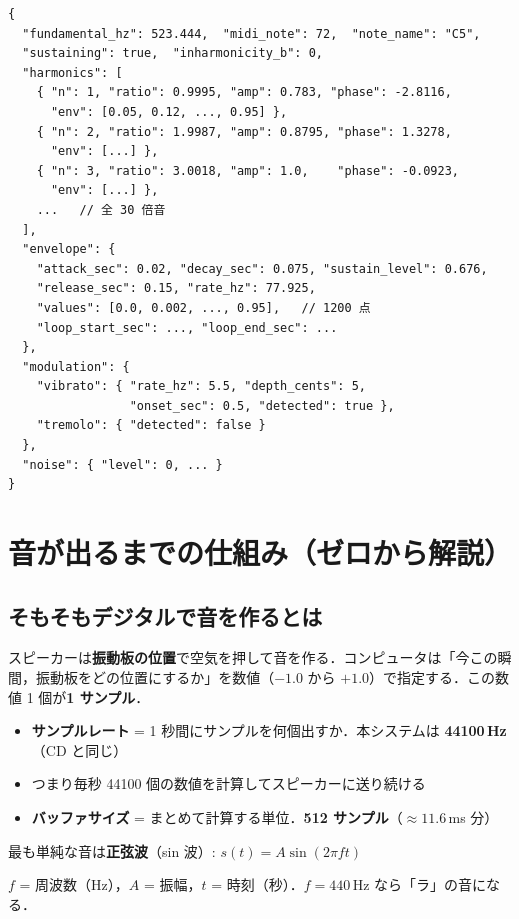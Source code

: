 \documentclass[uplatex,dvipdfmx,a4paper,10pt]{jsarticle}
\begin{document}
\begingroup\footnotesize
\begin{verbatim}
{
  "fundamental_hz": 523.444,  "midi_note": 72,  "note_name": "C5",
  "sustaining": true,  "inharmonicity_b": 0,
  "harmonics": [
    { "n": 1, "ratio": 0.9995, "amp": 0.783, "phase": -2.8116,
      "env": [0.05, 0.12, ..., 0.95] },
    { "n": 2, "ratio": 1.9987, "amp": 0.8795, "phase": 1.3278,
      "env": [...] },
    { "n": 3, "ratio": 3.0018, "amp": 1.0,    "phase": -0.0923,
      "env": [...] },
    ...   // 全 30 倍音
  ],
  "envelope": {
    "attack_sec": 0.02, "decay_sec": 0.075, "sustain_level": 0.676,
    "release_sec": 0.15, "rate_hz": 77.925,
    "values": [0.0, 0.002, ..., 0.95],   // 1200 点
    "loop_start_sec": ..., "loop_end_sec": ...
  },
  "modulation": {
    "vibrato": { "rate_hz": 5.5, "depth_cents": 5,
                 "onset_sec": 0.5, "detected": true },
    "tremolo": { "detected": false }
  },
  "noise": { "level": 0, ... }
}
\end{verbatim}
\endgroup

\section{音が出るまでの仕組み（ゼロから解説）}

\subsection{そもそもデジタルで音を作るとは}

スピーカーは\textbf{振動板の位置}で空気を押して音を作る．コンピュータは「今この瞬間，振動板をどの位置にするか」を数値（$-1.0$ から $+1.0$）で指定する．この数値 1 個が\textbf{1 サンプル}．

\begin{itemize}
  \item \textbf{サンプルレート} = 1 秒間にサンプルを何個出すか．本システムは \textbf{44100\,Hz}（CD と同じ）
  \item つまり毎秒 44100 個の数値を計算してスピーカーに送り続ける
  \item \textbf{バッファサイズ} = まとめて計算する単位．\textbf{512 サンプル}（$\approx 11.6$\,ms 分）
\end{itemize}

最も単純な音は\textbf{正弦波}（sin 波）: $s(t) = A \sin(2\pi f t)$

$f$ = 周波数（Hz），$A$ = 振幅，$t$ = 時刻（秒）．$f = 440$\,Hz なら「ラ」の音になる．
\end{document}
